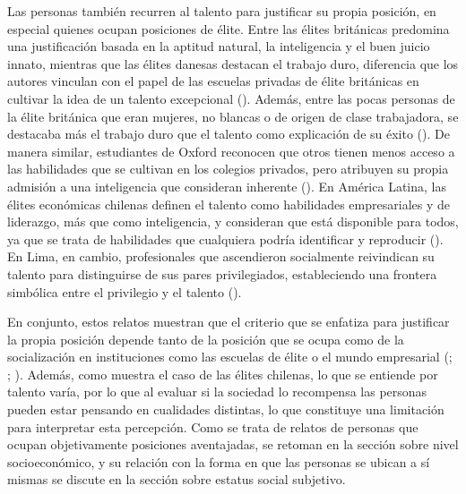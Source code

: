 \documentclass[
  spanish,
  a4paper,
  oneside]{scrbook}
\begin{document}
Las personas también recurren al talento para justificar su propia
posición, en especial quienes ocupan posiciones de élite. Entre las
élites británicas predomina una justificación basada en la aptitud
natural, la inteligencia y el buen juicio innato, mientras que las
élites danesas destacan el trabajo duro, diferencia que los autores
vinculan con el papel de las escuelas privadas de élite británicas en
cultivar la idea de un talento excepcional
().
Además, entre las pocas personas de la élite británica que eran mujeres,
no blancas o de origen de clase trabajadora, se destacaba más el trabajo
duro que el talento como explicación de su éxito
().
De manera similar, estudiantes de Oxford reconocen que otros tienen
menos acceso a las habilidades que se cultivan en los colegios privados,
pero atribuyen su propia admisión a una inteligencia que consideran
inherente (). En América Latina, las élites económicas chilenas
definen el talento como habilidades empresariales y de liderazgo, más
que como inteligencia, y consideran que está disponible para todos, ya
que se trata de habilidades que cualquiera podría identificar y
reproducir (). En Lima, en cambio, profesionales que
ascendieron socialmente reivindican su talento para distinguirse de sus
pares privilegiados, estableciendo una frontera simbólica entre el
privilegio y el talento ().

En conjunto, estos relatos muestran que el criterio que se enfatiza para
justificar la propia posición depende tanto de la posición que se ocupa
como de la socialización en instituciones como las escuelas de élite o
el mundo empresarial
(; ;
).
Además, como muestra el caso de las élites chilenas, lo que se entiende
por talento varía, por lo que al evaluar si la sociedad lo recompensa
las personas pueden estar pensando en cualidades distintas, lo que
constituye una limitación para interpretar esta percepción. Como se
trata de relatos de personas que ocupan objetivamente posiciones
aventajadas, se retoman en la sección sobre nivel socioeconómico, y su
relación con la forma en que las personas se ubican a sí mismas se
discute en la sección sobre estatus social subjetivo.
\end{document}
